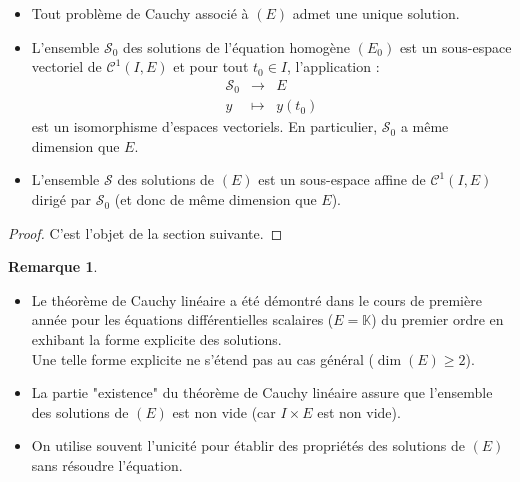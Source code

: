 \documentclass[french]{article}
\newcommand{\K}{\mathbb{K}}
\theoremstyle{plain}
\theoremstyle{definition}
\newtheorem*{rmq}{Remarque}
\theoremstyle{remark}
\begin{document}
\begin{thm}%
	\begin{itemize}
		\item Tout problème de Cauchy associé à $(E)$ admet une unique solution.
		\item L'ensemble $\mathcal{S}_0$ des solutions de l'équation homogène $(E_0)$ est un sous-espace vectoriel de $\mathcal{C}^1(I,E)$ et pour tout $t_0\in I$, l'application :
		$$\begin{array}{rcl}
			\mathcal{S}_0&\longrightarrow& E\\
			y&\longmapsto& y(t_0)
		\end{array}$$ est un isomorphisme d'espaces vectoriels. En particulier, $\mathcal{S}_0$ a même dimension que $E$.
		\item L'ensemble $\mathcal{S}$ des solutions de $(E)$ est un sous-espace affine de $\mathcal{C}^1(I,E)$ dirigé par $\mathcal{S}_0$ (et donc de même dimension que $E$).
	\end{itemize}
\end{thm}
\begin{proof}
	C'est l'objet de la section suivante.
\end{proof}

\begin{rmq}
	\begin{itemize}
		\item Le théorème de Cauchy linéaire a été démontré dans le cours de première année pour les équations différentielles scalaires ($E=\K$) du premier ordre en exhibant la forme explicite des solutions.\\
		Une telle forme explicite ne s'étend pas au cas général ($\dim(E)\geqslant 2$).
		\item La partie "existence" du théorème de Cauchy linéaire assure que l'ensemble des solutions de $(E)$ est non vide (car $I\times E$ est non vide).
		\item On utilise souvent l'unicité pour établir des propriétés des solutions de $(E)$ sans résoudre l'équation.
	\end{itemize}
\end{rmq}
\end{document}
